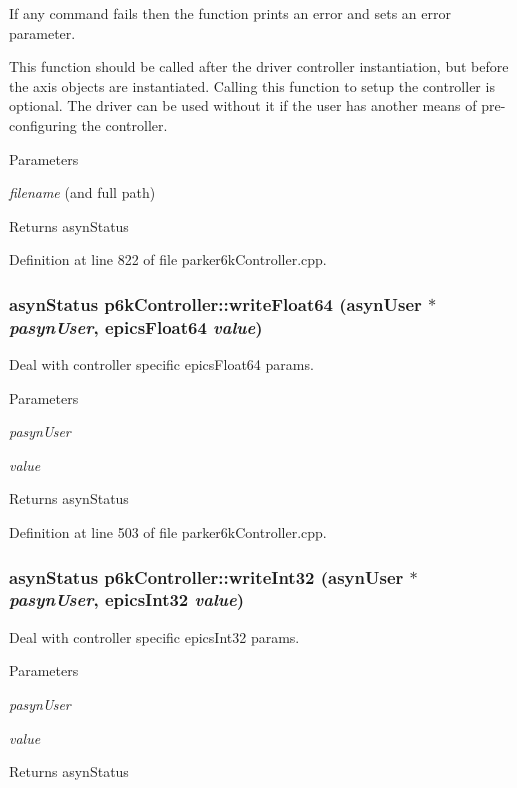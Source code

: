 If any command fails then the function prints an error and sets an error parameter.

This function should be called after the driver controller instantiation, but before the axis objects are instantiated. Calling this function to setup the controller is optional. The driver can be used without it if the user has another means of pre-\/configuring the controller.


\begin{DoxyParams}{Parameters}
\item[{\em filename}](and full path) \end{DoxyParams}
\begin{DoxyReturn}{Returns}
asynStatus 
\end{DoxyReturn}


Definition at line 822 of file parker6kController.cpp.\hypertarget{classp6kController_a9a0b81dabca6419fafe18f36f9abb2e9}{
\subsubsection[{writeFloat64}]{\setlength{\rightskip}{0pt plus 5cm}asynStatus p6kController::writeFloat64 (asynUser $\ast$ {\em pasynUser}, \/  epicsFloat64 {\em value})}}
\label{classp6kController_a9a0b81dabca6419fafe18f36f9abb2e9}
Deal with controller specific epicsFloat64 params. 
\begin{DoxyParams}{Parameters}
\item[{\em pasynUser}]\item[{\em value}]\end{DoxyParams}
\begin{DoxyReturn}{Returns}
asynStatus 
\end{DoxyReturn}


Definition at line 503 of file parker6kController.cpp.\hypertarget{classp6kController_a9130075d7f114acc2a35a53a85b5431a}{
\subsubsection[{writeInt32}]{\setlength{\rightskip}{0pt plus 5cm}asynStatus p6kController::writeInt32 (asynUser $\ast$ {\em pasynUser}, \/  epicsInt32 {\em value})}}
\label{classp6kController_a9130075d7f114acc2a35a53a85b5431a}
Deal with controller specific epicsInt32 params. 
\begin{DoxyParams}{Parameters}
\item[{\em pasynUser}]\item[{\em value}]\end{DoxyParams}
\begin{DoxyReturn}{Returns}
asynStatus 
\end{DoxyReturn}


